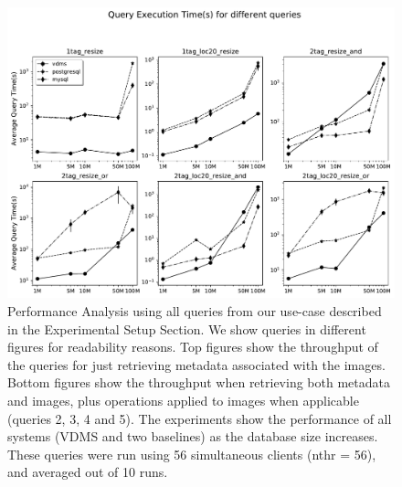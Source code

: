 \begin{figure}[ht]
\includegraphics[width=\textwidth]{figures/plot_th_56_mosaic_query_times}
\caption{Performance Analysis using all queries from our use-case
described in the Experimental Setup Section.
We show queries in different figures for readability reasons.
Top figures show the throughput of the queries for
just retrieving metadata associated with the images.
Bottom figures show the throughput when retrieving both metadata and images,
plus operations applied to images when applicable (queries 2, 3, 4 and 5).
The experiments show the performance of all systems (VDMS and two baselines) as the
database size increases.
These queries were run using 56 simultaneous clients (nthr = 56),
and averaged out of 10 runs.}
\label{fig:q_performance_56}
\end{figure}


